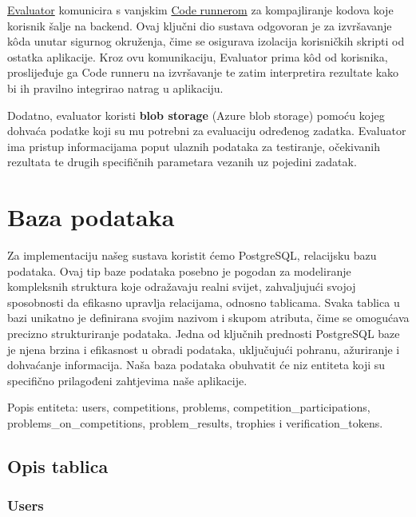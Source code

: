 	{\underline{Evaluator} komunicira s vanjskim \underline{Code runnerom} za kompajliranje kodova koje korisnik šalje
	na backend. Ovaj ključni dio sustava odgovoran je za izvršavanje kôda unutar sigurnog okruženja, čime se osigurava
	izolacija korisničkih skripti od ostatka aplikacije. Kroz ovu komunikaciju, Evaluator prima kôd od korisnika,
	proslijeđuje ga Code runneru na izvršavanje te zatim interpretira rezultate kako bi ih pravilno integrirao
	natrag u aplikaciju.}

	{Dodatno, evaluator koristi \textbf{blob storage} (Azure blob storage) pomoću kojeg dohvaća podatke koji su mu potrebni za
	evaluaciju određenog zadatka. Evaluator ima pristup informacijama poput ulaznih podataka za testiranje,
	očekivanih rezultata te drugih specifičnih parametara vezanih uz pojedini zadatak.}
	
	\newpage
	
		

		

				
		\section{Baza podataka}
		
		Za implementaciju našeg sustava koristit ćemo PostgreSQL, relacijsku bazu podataka. Ovaj tip baze podataka posebno je pogodan za modeliranje kompleksnih struktura koje odražavaju realni svijet, zahvaljujući svojoj sposobnosti da efikasno upravlja relacijama, odnosno tablicama. Svaka tablica u bazi unikatno je definirana svojim nazivom i skupom atributa, čime se omogućava precizno strukturiranje podataka. Jedna od ključnih prednosti PostgreSQL baze je njena brzina i efikasnost u obradi podataka, uključujući pohranu, ažuriranje i dohvaćanje informacija. Naša baza podataka obuhvatit će niz entiteta koji su specifično prilagođeni zahtjevima naše aplikacije.
		
		\noindent Popis entiteta: users, competitions, problems, competition\_participations, problems\_on\_competitions, 
			problem\_results, trophies i verification\_tokens.
		
		
		\eject
		\subsection{Opis tablica}
		
		
		\subsubsection*{Users}
		
